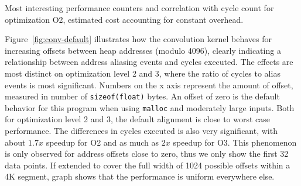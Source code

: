 \documentclass[a4paper,10pt,twocolumn,twoside]{article}
\newcommand{\perfctr}[1] {
  {\lowercase{#1}}
}
\begin{document}
{%
\begin{table*}[t]
  \caption{Most interesting performance counters and correlation with cycle count for optimization O2, estimated cost accounting for constant overhead.}
  \label{tab:convstats}
  \pgfplotstabletypeset[
    font=\small,
    int detect, %
    col sep=comma,
    columns={Performance counter, Correlation, 0, 2, 4, 8},
    column type=r,
    columns/Performance counter/.style={
      string type, 
      column type=l,
      postproc cell content/.append code={
        \pgfkeysalso{@cell content=\perfctr{##1}}
      }
    },
    columns/Correlation/.style={
      fixed,
      fixed zerofill,
      precision=2
    },
    every head row/.style={
      output empty row,
      before row={\toprule
        Performance counter & $r$ & 0 & 2 & 4 & 8 \\
        },
      after row=\midrule,
    },
    every last row/.style={after row=\bottomrule}
  ]{bin/conv-default-o2.estimate.csv}
\end{table*}

Figure~\ref{fig:conv-default} illustrates how the convolution kernel behaves for increasing offsets between heap addresses (modulo 4096), clearly indicating a relationship between address aliasing events and cycles executed.
The effects are most distinct on optimization level 2 and 3, where the ratio of cycles to alias events is most significant.
Numbers on the x axis represent the amount of offset, measured in number of \texttt{sizeof(float)} bytes.
An offset of zero is the default behavior for this program when using \texttt{malloc} and moderately large inputs.
Both for optimization level 2 and 3, the default alignment is close to worst case performance.
The differences in cycles executed is also very significant, with about $1.7x$ speedup for O2 and as much as $2x$ speedup for O3.
This phenomenon is only observed for address offsets close to zero, thus we only show the first 32 data points.
If extended to cover the full width of 1024 possible offsets within a 4K segment, graph shows that the performance is uniform everywhere else.

}
\end{document}

